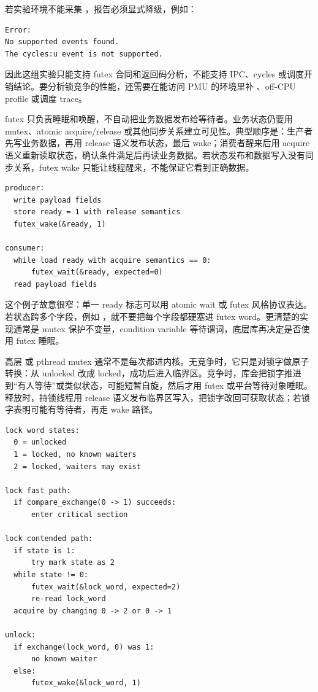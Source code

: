 若实验环境不能采集 ，报告必须显式降级，例如：

\begin{lstlisting}[numbers=none,caption={perf 计数器边界}]
Error:
No supported events found.
The cycles:u event is not supported.
\end{lstlisting}

因此这组实验只能支持 futex 合同和返回码分析，不能支持 IPC、cycles 或调度开销结论。要分析锁竞争的性能，还需要在能访问 PMU 的环境里补 、off-CPU profile 或调度 trace。

futex 只负责睡眠和唤醒，不自动把业务数据发布给等待者。业务状态仍要用 mutex、atomic acquire/release 或其他同步关系建立可见性。典型顺序是：生产者先写业务数据，再用 release 语义发布状态，最后 wake；消费者醒来后用 acquire 语义重新读取状态，确认条件满足后再读业务数据。若状态发布和数据写入没有同步关系，futex wake 只能让线程醒来，不能保证它看到正确数据。

\begin{lstlisting}[numbers=none,caption={futex 和内存序的分工}]
producer:
  write payload fields
  store ready = 1 with release semantics
  futex_wake(&ready, 1)

consumer:
  while load ready with acquire semantics == 0:
      futex_wait(&ready, expected=0)
  read payload fields
\end{lstlisting}

这个例子故意很窄：单一 ready 标志可以用 atomic wait 或 futex 风格协议表达。若状态跨多个字段，例如 ，就不要把每个字段都硬塞进 futex word。更清楚的实现通常是 mutex 保护不变量，condition variable 等待谓词，底层库再决定是否使用 futex 睡眠。

高层  或 pthread mutex 通常不是每次都进内核。无竞争时，它只是对锁字做原子转换：从 unlocked 改成 locked，成功后进入临界区。竞争时，库会把锁字推进到“有人等待”或类似状态，可能短暂自旋，然后才用 futex 或平台等待对象睡眠。释放时，持锁线程用 release 语义发布临界区写入，把锁字改回可获取状态；若锁字表明可能有等待者，再走 wake 路径。

\begin{lstlisting}[numbers=none,caption={mutex 的典型三态锁字模型}]
lock word states:
  0 = unlocked
  1 = locked, no known waiters
  2 = locked, waiters may exist

lock fast path:
  if compare_exchange(0 -> 1) succeeds:
      enter critical section

lock contended path:
  if state is 1:
      try mark state as 2
  while state != 0:
      futex_wait(&lock_word, expected=2)
      re-read lock_word
  acquire by changing 0 -> 2 or 0 -> 1

unlock:
  if exchange(lock_word, 0) was 1:
      no known waiter
  else:
      futex_wake(&lock_word, 1)
\end{lstlisting}

